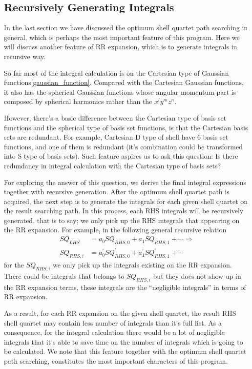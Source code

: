 \subsection{Recursively Generating Integrals}
%
%
%
\label{rr_intereal_gen}
In the last section we have discussed the optimum shell quartet
path searching in general, which is perhaps the most important feature of 
this program. Here we will discuss another feature of RR expansion,
which is to generate integrals in recursive way.

So far most of the integral calculation is on the Cartesian type 
of Gaussian functions\ref{gaussian_function}. 
Compared with the Cartesian Gaussian functions, it also has 
the spherical Gaussian functions whose angular momentum part is  
composed by spherical harmonics rather than the $x^{l}y^{m}z^{n}$. 

However, there's a basic difference between the Cartesian type of 
basis set functions and the spherical type of basis set functions, is 
that the Cartesian basis sets are redundant. For example, Cartesian
D type of shell have 6 basis set functions, and one of them is 
redundant (it's combination could be transformed into S type of 
basis sets). Such feature aspires us to ask this question:
Is there redundancy in integral calculation with the Cartesian
type of basis sets?

For exploring the answer of this question, we derive the final 
integral expressions together with recursive generation. After 
the optimum shell quartet path is acquired, the next step is to
generate the integrals for each given shell quartet on the result
searching path. In this process, each RHS integrals will be 
recursively generated, that is to say; we only pick up the RHS
integrals that appearing on the RR expansion. For example, in 
the following general recursive relation
\begin{align}
 SQ_{LHS}  &= a_{0}SQ_{RHS,0} + a_{1}SQ_{RHS,1} + \cdots \Rightarrow \nonumber \\
 SQ_{RHS,i} &= a^{'}_{0}SQ^{'}_{RHS,0} + a^{'}_{1}SQ^{'}_{RHS,1} + \cdots
\end{align}
for the $SQ_{RHS,i}$ we only pick up the integrals existing on the RR 
expansion. There could be integrals that belongs to $SQ_{RHS,i}$ but 
they does not show up in the RR expansion terms, these integrals
are the ``negligible integrals'' in terms of RR expansion. 

As a result, for each RR expansion on the given shell quartet, the 
result RHS shell quartet may contain less number of integrals than
it's full list. As a consequence, for the integral calculation 
there would be a lot of negligible integrals that it's able to save 
time on the number of integrals which is going to be calculated. 
We note that this feature together with the optimum shell quartet 
path searching, constitutes the most important characters of this 
program.

